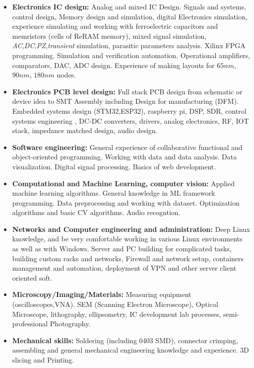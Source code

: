 \documentclass{article}
\begin{document}
\begin{itemize}

\item \textbf{Electronics IC design:} Analog and mixed IC Design. Signals and systems, control design, Memory design and simulation, digital Electronics simulation, experience simulating and working with ferroelectric capacitors and memristors (cells of ReRAM memory), mixed signal simulation, \textit{AC,DC,PZ,transient} simulation, parasitic parameters analysis. Xilinx FPGA programming. Simulation and verification automation. Operational amplifiers, comparators, DAC, ADC design. Experience of making layouts for $65 nm$, $90nm$, $180nm$ nodes.
\item \textbf{Electronics PCB level design:} Full stack PCB design from schematic or device idea to SMT Assembly including Design for manufacturing (DFM). Embedded systems design (STM32,ESP32), raspberry pi, DSP, SDR,  control systems engineering , DC-DC converters, drivers, analog electronics, RF, IOT stack, impedance matched design, audio design.
\item \textbf{Software engineering:} General experience of collaborative functional and object-oriented programming. Working with data and data analysis. Data visualization. Digital signal processing. Basics of web development.
\item \textbf{Computational and Machine Learning, computer vision:} Applied machine learning algorithms. General knowledge in ML framework programming. Data preprocessing and working with dataset. Optimization algorithms and basic CV algorithms. Audio recogntion.
\item \textbf{Networks and Computer engineering and administration:} Deep Linux knowledge, and be very comfortable working in various Linux environments as well as with Windows. Server and PC building for complicated tasks, building custom racks and networks, Firewall and network setup, containers management and automation, deployment of VPN and other server client oriented soft.
\item \textbf{Microscopy/Imaging/Materials:} Measuring equipment (oscilloscopes,VNA). SEM (Scanning Electron Microscope), Optical Microscope, lithography, ellipsometry, IC development lab processes, semi-professional Photography.
\item \textbf{Mechanical skills:} Soldering (including 0403 SMD), connector crimping,  assembling and general mechanical engineering knowledge and experience. 3D slicing and Printing.
\end{itemize}
 
\end{document}
